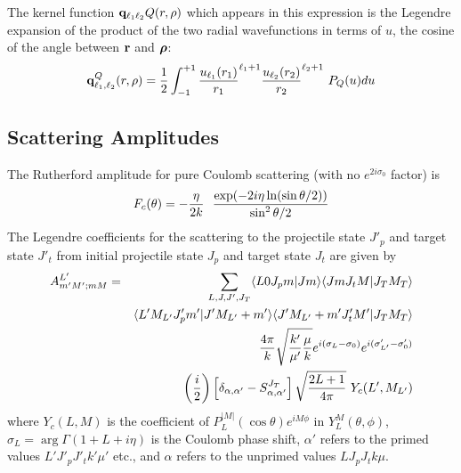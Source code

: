 \documentclass[11pt,a4paper]{article}
\newcommand{\vecr}{{\bf r}}
\newcommand{\brho}{{\mbox{\boldmath $\rho$}}}
\newcommand{\half}{\frac{1}{2}}
\begin{document}
The kernel function
${\bf q}_{\ell_1 \ell_2}Q (r, \rho) $
which appears in this expression is the Legendre expansion of the product of
the two radial wavefunctions in terms of $u$,
the cosine of the angle between $\vecr$ and $ {\brho} $:
\begin{eqnarray}
 {\bf q}^Q_ {\ell_1 , \ell_2} (r, \rho)
 =\half
\int_ {-1}^{+1}
         {u_{\ell_1} (r_1) \over r_1}^{\ell_1 +1}
       {u_{\ell_2} (r_2)\over r_2}^{\ell_2 +1} ~
         P_Q (u) du
\end{eqnarray}

\subsection{Scattering Amplitudes}

The Rutherford amplitude for pure Coulomb scattering
(with no $ e^{2i \sigma_0} $ factor) is
\begin{eqnarray} \label{ruther}
F_c ( \theta ) = - {\eta \over 2k} ~~
               { \exp (-2 i \eta \ln(\sin \theta /2))  \over  \sin^2 \theta /2}
\end{eqnarray}
The Legendre coefficients for the scattering to the projectile state
$ J'_ p $ and target state $ J'_ t $
from initial projectile state $ J_p $
and target state $ J_t $ are given by
\begin{eqnarray}  \nonumber
 A^{L'}_{m' M' ;mM} &=&
   \sum_{L,J,J' ,J_T }
    \langle L0 J_p m | Jm\rangle\langle Jm J_t M |J_T M_T\rangle \\
&& \langle L' M_{L'} J'_ p m' | J' M_{L'} + m'\rangle
    \langle J' M_{L'}  +m' J'_ t M' |J_T M_T\rangle \nonumber\\
&&  \nonumber
  {4 \pi \over k} \sqrt {\frac{k'}{\mu'}\frac{\mu}{k}}
    e^{i( \sigma_L - \sigma_0 )}
      e^{i( \sigma'_ {L'} - \sigma'_ 0 )}\\
&&  \label{ALeg}
  \left ( {i \over 2} \right )
      \left [ \delta_{\alpha ,\alpha'} - S^{J_T}_{\alpha ,\alpha'} \right ]
    \sqrt {{2L+1 \over {4 \pi}}}~ Y_c (L' ,M_{L'})
\end{eqnarray}
where $Y_c (L,M)$ is the coefficient of
$P_L^{|M|} (\cos \theta )
    e^{iM\phi}$ in $Y_L^M (\theta ,\phi )$,
$  \sigma_L = \arg \Gamma (1 + L + i \eta )$ is the Coulomb phase shift,
$\alpha'$ refers to the primed values
$ L'  J'_ p J'_ t  k' \mu' $ etc.,
and $\alpha$ refers to the unprimed values
$ L J_p J_t k \mu $.
\end{document}
